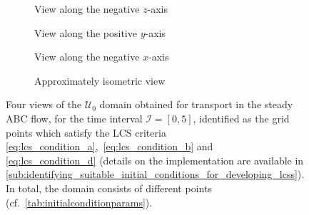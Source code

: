 \begin{figure}[htpb]
    \centering
    \hspace*{\fill}
    \begin{subfigure}[b]{0.43\textwidth}
        \centering
        \caption[]{{\small View along the negative $z$-axis}}
        \label{fig:steady_abd_z}
    \end{subfigure}\hfill%
    \begin{subfigure}[b]{0.43\textwidth}
        \centering
        \caption[]{{\small View along the positive $y$-axis}}
        \label{fig:steady_abd_y}
    \end{subfigure}%
    \hspace*{\fill}

    \hspace*{\fill}
    \begin{subfigure}[b]{0.43\textwidth}
        \centering
        \caption[]{{\small View along the negative $x$-axis}}
        \label{fig:steady_abd_x}
    \end{subfigure}\hfill%
    \begin{subfigure}[b]{0.43\textwidth}
        \centering
        \caption[]{{\small Approximately isometric view}}
        \label{fig:steady_abd_isometric}
    \end{subfigure}%
    \hspace*{\fill}
    \caption[Four views of the $\mathcal{U}_{0}$ domain obtained for transport
    in the steady ABC flow]
    {
        Four views of the $\mathcal{U}_{0}$ domain obtained for transport in the
        steady ABC flow, for the time interval $\mathcal{I}=[0,5]$, identified
        as the grid points which satisfy the LCS criteria
        \eqref{eq:lcs_condition_a},~\eqref{eq:lcs_condition_b} and~
        \eqref{eq:lcs_condition_d} (details on the implementation are available
        in
        \cref{sub:identifying_suitable_initial_conditions_for_developing_lcss}).
        In total, the domain consists of  different points
        (cf.\ \cref{tab:initialconditionparams}).
}
    \label{fig:steady_abd}
\end{figure}

